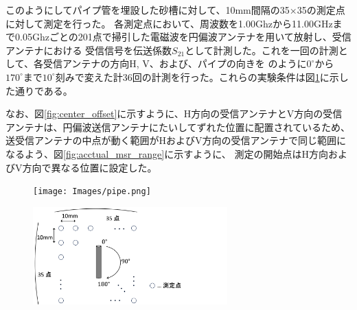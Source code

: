 \documentclass[11pt,a4paper,uplatex,draft]{ujarticle}
\begin{document}
  このようにしてパイプ管を埋設した砂槽に対して、10mm間隔の35×35の測定点に対して測定を行った。
  各測定点において、周波数を1.00Ghzから11.00GHzまで0.05Ghzごとの201点で掃引した電磁波を円偏波アンテナを用いて放射し、受信アンテナにおける
  受信信号を伝送係数$S_{21}$として計測した。これを一回の計測として、各受信アンテナの方向H, V、および、パイプの向きを
  のように$0^{\circ}$から$170^{\circ}$まで$10^{\circ}$刻みで変えた計36回の計測を行った。これらの実験条件は図\ref{fig:msr_cond}に示した通りである。

  なお、図\ref{fig:center_offset}に示すように、H方向の受信アンテナとV方向の受信アンテナは、円偏波送信アンテナにたいしてずれた位置に配置されているため、
  送受信アンテナの中点が動く範囲がHおよびV方向の受信アンテナで同じ範囲になるよう、図\ref{fig:acctual_msr_range}に示すように、
  測定の開始点はH方向およびV方向で異なる位置に設定した。


  \begin{figure}[tbp]
    \begin{minipage}[b]{0.5\textwidth}
      \centering
      \texttt{[image: Images/pipe.png]}
      \label{fig:pipe}
    \end{minipage}
    \begin{minipage}[b]{0.5\textwidth}
      \centering
      \includegraphics[keepaspectratio, width=75mm]{Images/msr_cond.png}
      \label{fig:msr_cond}
    \end{minipage}
  \end{figure}
\end{document}
